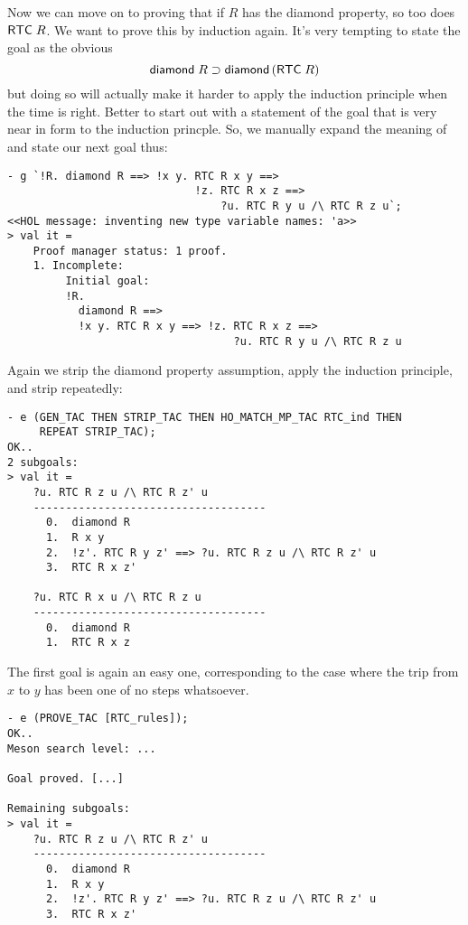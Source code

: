 Now we can move on to proving that if $R$ has the diamond property, so
too does ${\sf RTC}\;R$.  We want to prove this by induction again.
It's very tempting to state the goal as the obvious \[
{\sf diamond}\;R\supset{\sf diamond}\,({\sf RTC}\;R)
\] but doing so will actually make it harder to apply the induction
principle when the time is right.  Better to start out with a
statement of the goal that is very near in form to the induction
princple.  So, we manually expand the meaning of  and state
our next goal thus:
\begin{session}
\begin{verbatim}
- g `!R. diamond R ==> !x y. RTC R x y ==>
                             !z. RTC R x z ==>
                                 ?u. RTC R y u /\ RTC R z u`;
<<HOL message: inventing new type variable names: 'a>>
> val it =
    Proof manager status: 1 proof.
    1. Incomplete:
         Initial goal:
         !R.
           diamond R ==>
           !x y. RTC R x y ==> !z. RTC R x z ==>
                                   ?u. RTC R y u /\ RTC R z u
\end{verbatim}
\end{session}
    Again we strip the diamond property assumption, apply the
    induction principle, and strip repeatedly:
\begin{session}
\begin{verbatim}
- e (GEN_TAC THEN STRIP_TAC THEN HO_MATCH_MP_TAC RTC_ind THEN
     REPEAT STRIP_TAC);
OK..
2 subgoals:
> val it =
    ?u. RTC R z u /\ RTC R z' u
    ------------------------------------
      0.  diamond R
      1.  R x y
      2.  !z'. RTC R y z' ==> ?u. RTC R z u /\ RTC R z' u
      3.  RTC R x z'

    ?u. RTC R x u /\ RTC R z u
    ------------------------------------
      0.  diamond R
      1.  RTC R x z
\end{verbatim}
\end{session}
The first goal is again an easy one, corresponding to the case where
the trip from $x$ to $y$ has been one of no steps whatsoever.
\begin{session}
\begin{verbatim}
- e (PROVE_TAC [RTC_rules]);
OK..
Meson search level: ...

Goal proved. [...]

Remaining subgoals:
> val it =
    ?u. RTC R z u /\ RTC R z' u
    ------------------------------------
      0.  diamond R
      1.  R x y
      2.  !z'. RTC R y z' ==> ?u. RTC R z u /\ RTC R z' u
      3.  RTC R x z'
\end{verbatim}
\end{session}
